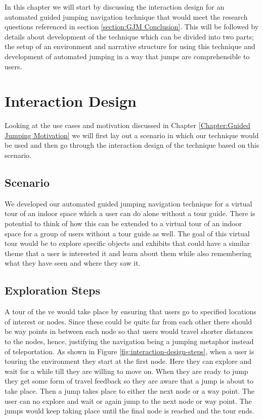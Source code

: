 \label{Chapter:Automated Guided Jumping}
In this chapter we will start by discussing the interaction design for an automated guided jumping navigation technique that would meet the research questions referenced in section \ref{section:GJM Conclusion}. This will be followed by details about development of the technique which can be divided into two parts; the setup of an environment and narrative structure for using this technique and development of automated jumping in a way that jumps are comprehensible to users. 

\section{Interaction Design}
\label{section AGJ: Interaction Design}
Looking at the use cases and motivation discussed in Chapter \ref{Chapter:Guided Jumping Motivation} we will first lay out a scenario in which our technique would be used and then go through the interaction design of the technique based on this scenario.

\subsection{Scenario}
\label{subsection AGJ ID: Scenario}
We developed our automated guided jumping navigation technique  for a virtual tour of an indoor space which a user can do alone without a tour guide. There is potential to think of how this can be extended to a virtual tour of an indoor space for a group of users without a tour guide as well. The goal of this virtual tour would be to explore specific objects and exhibits that could have a similar theme that a user is interested it and learn about them while also remembering what they have seen and where they saw it. 

\subsection{Exploration Steps}
\label{subsection AGJ ID: Exploration Steps}
A tour of the \acrshort{ve} would take place by ensuring that users go to specified locations of interest or nodes. Since these could be quite far from each other there should be way points in between each node so that users would travel shorter distances to the nodes, hence, justifying the navigation being a jumping metaphor instead of teleportation. As shown in Figure \ref{fig:interaction-design-steps}, when a user is touring the environment they start at the first node. Here they can explore and wait for a while till they are willing to move on. When they are ready to jump they get some form of travel feedback so they are aware that a jump is about to take place. Then a jump takes place to either the next node or a way point. The user can no explore and wait or again jump to the next node or way point. The jumps would keep taking place until the final node is reached and the tour ends. 

